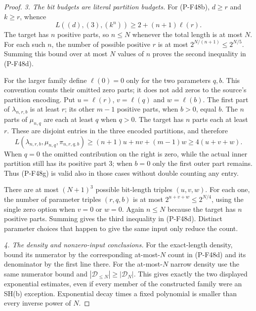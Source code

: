 \documentclass[11pt,a4paper]{article}
\begin{document}
\begin{proof}
\emph{3. The bit budgets are literal partition budgets.}
For (P-F48b), $d\ge r$ and $k\ge r$, whence
\[
             L((d),(3),(k^n))
                      \ge 2+(n+1)\ell(r).
 \tag{P-F48f}
\]
The target has $n$ positive parts, so $n\le N$ whenever
the total length is at most $N$. For each such $n$,
the number of possible positive $r$ is at most
$2^{N/(n+1)}\le2^{N/5}$.
Summing this bound over at most $N$ values of $n$
proves the second inequality in (P-F48d).

For the larger family define $\ell(0)=0$ only for the
two parameters $q,b$. This convention counts their
omitted zero parts; it does not add zeros to the source's
partition encoding. Put
$u=\ell(r)$, $v=\ell(q)$ and $w=\ell(b)$.
The first part of $\lambda_{n,r,b}$ is at least $r$;
its other $m-1$ positive parts, when $b>0$, equal $b$.
The $n$ parts of $\mu_{n,q}$ are each at least $q$
when $q>0$. The target has $n$ parts each at least $r$.
These are disjoint entries in the three encoded
partitions, and therefore
\[
              L(\lambda_{n,r,b},\mu_{n,q},\pi_{n,r,q,b})
                   \ge (n+1)u+nv+(m-1)w
                   \ge4(u+v+w).
 \tag{P-F48g}
\]
When $q=0$ the omitted contribution on the right is
zero, while the actual inner partition still has its
positive part $3$; when $b=0$ only the first outer
part remains. Thus (P-F48g) is valid also in those
cases without double counting any entry.

There are at most $(N+1)^3$ possible bit-length triples
$(u,v,w)$. For each one, the number of parameter triples
$(r,q,b)$ is at most $2^{u+v+w}\le2^{N/4}$, using the
single zero option when $v=0$ or $w=0$.
Again $n\le N$ because the target has $n$ positive
parts. Summing gives the third inequality in
(P-F48d). Distinct parameter choices that happen to
give the same input only reduce the count.

\emph{4. The density and nonzero-input conclusions.}
For the exact-length density, bound its numerator by
the corresponding at-most-$N$ count in (P-F48d) and
its denominator by the first line there.
For the at-most-$N$ narrow density use the same numerator
bound and $|\mathcal D_{\le N}|\ge|\mathcal D_N|$.
This gives exactly the two displayed exponential
estimates, even if every member of the constructed
family were an SH(b) exception. Exponential decay
times a fixed polynomial is smaller than every
inverse power of $N$.


\end{proof}
\end{document}
